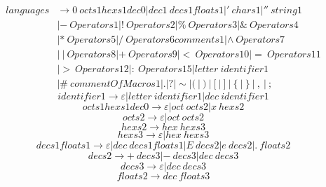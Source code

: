 \documentclass{article}
\begin{document}
\begin{equation}
	\begin{aligned}
		languages & \rightarrow 0 \ octs1hexs1dec0 | dec1 \ decs1floats1 | ' \ chars1 | '' \ string1           \\
		          & | - \ Operators1 | ! \ Operators2 | \% \ Operators3  | \& \ Operators4                                   \\
		          & | * \ Operators5  | / \ Operators6comments1 | \wedge \ Operators7                                                    \\
		          & | \ | \ Operators8 | + \ Operators9  | < \ Operators10 | = \ Operators11                                                   \\
		          & | > \ Operators12  | \colon \ Operators15 | letter \ identifier1                                                   \\
		          & | \# \ commentOfMacros1  | . | ? | \sim | (  \ | \  )  \ | \  [  \ | \  ]  \ | \  \{  \ | \  \}  \ | \  ,  \ | \  ;
	\end{aligned}
\end{equation}
\begin{equation}
	identifier1 \rightarrow \varepsilon | letter \ identifier1 | dec \ identifier1
\end{equation}
\begin{equation}
	octs1hexs1dec0 \rightarrow \varepsilon | oct \ octs2 | x \ hexs2
\end{equation}
\begin{equation}
	octs2 \rightarrow \varepsilon | oct \ octs2
\end{equation}
\begin{equation}
	hexs2 \rightarrow hex \ hexs3
\end{equation}
\begin{equation}
	hexs3 \rightarrow \varepsilon | hex \ hexs3
\end{equation}
\begin{equation}
	decs1floats1 \rightarrow \varepsilon | dec \ decs1floats1 | E \ decs2 | e \ decs2 | . \ floats2
\end{equation}
\begin{equation}
	decs2 \rightarrow + \ decs3 | - \ decs3 | dec \ decs3
\end{equation}
\begin{equation}
	decs3 \rightarrow \varepsilon | dec \ decs3
\end{equation}
\begin{equation}
	floats2 \rightarrow dec \ floats3
\end{equation}
\end{document}

